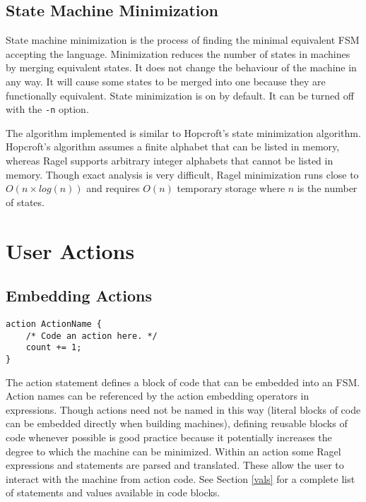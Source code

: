 \documentclass[letterpaper,11pt,oneside]{book}
\newcommand{\verbspace}{\vspace{10pt}}
\begin{document}

\section{State Machine Minimization}

State machine minimization is the process of finding the minimal equivalent FSM accepting
the language. Minimization reduces the number of states in machines
by merging equivalent states. It does not change the behaviour of the machine
in any way. It will cause some states to be merged into one because they are
functionally equivalent. State minimization is on by default. It can be turned
off with the \verb|-n| option.

The algorithm implemented is similar to Hopcroft's state minimization
algorithm. Hopcroft's algorithm assumes a finite alphabet that can be listed in
memory, whereas Ragel supports arbitrary integer alphabets that cannot be
listed in memory. Though exact analysis is very difficult, Ragel minimization
runs close to $O(n \times log(n))$ and requires $O(n)$ temporary storage where
$n$ is the number of states.

\chapter{User Actions}

\section{Embedding Actions}

\begin{verbatim}
action ActionName {
    /* Code an action here. */
    count += 1;
}
\end{verbatim}
\verbspace

The action statement defines a block of code that can be embedded into an FSM.
Action names can be referenced by the action embedding operators in
expressions. Though actions need not be named in this way (literal blocks
of code can be embedded directly when building machines), defining reusable
blocks of code whenever possible is good practice because it potentially increases the
degree to which the machine can be minimized. Within an action some Ragel expressions
and statements are parsed and translated. These allow the user to interact with the machine
from action code. See Section \ref{vals} for a complete list of statements and
values available in code blocks. 
\end{document}
